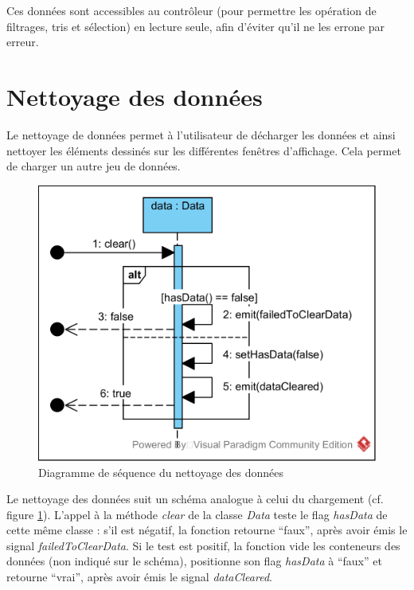 \documentclass[12pt]{article}
\begin{document}
	Ces données sont accessibles au contrôleur (pour permettre les opération de filtrages, tris et sélection) en lecture seule, afin d’éviter qu’il ne les errone par erreur.\\

\newpage
	\section{Nettoyage des données}
	Le nettoyage de données permet à l'utilisateur de décharger les données et ainsi nettoyer
	les éléments dessinés sur les différentes fenêtres d'affichage. Cela permet de charger 
	un autre jeu de données.\\
	
	\begin{figure}[!h]
	\begin{center}
	\includegraphics[scale=1]{dia_sequence_clear.png}
	\caption{ Diagramme de séquence du nettoyage des données}
	\label{fig:nettoyage}
	\end{center}
	\end{figure}
	
	Le nettoyage des données suit un schéma analogue à celui du chargement (cf. figure \ref{fig:nettoyage}). L’appel à la méthode \textit{clear} de la classe \textit{Data} teste le flag \textit{hasData} de cette même classe : s’il est négatif, la fonction retourne “faux”, après avoir émis le signal \textit{failedToClearData}. Si le test est positif, la fonction vide les conteneurs des données (non indiqué sur le schéma), positionne son flag \textit{hasData} à “faux” et retourne “vrai”, après avoir émis le signal \textit{dataCleared}.
\end{document}
